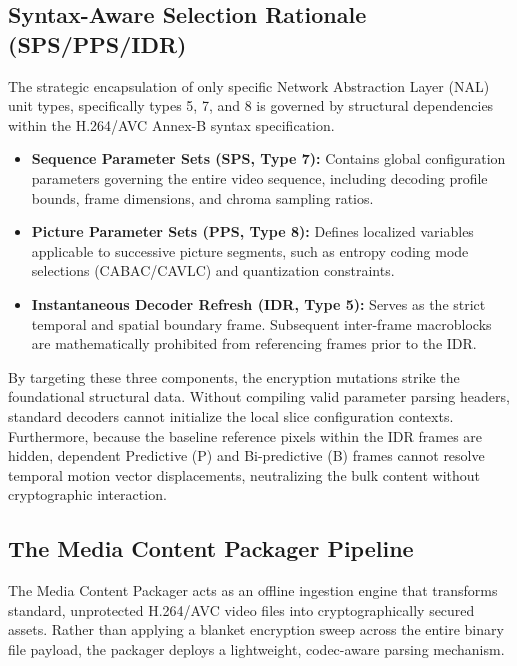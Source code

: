 \subsection{Syntax-Aware Selection Rationale (SPS/PPS/IDR)}
The strategic encapsulation of only specific Network Abstraction Layer (NAL) unit types, specifically types 5, 7, and 8 is governed by structural dependencies within the H.264/AVC Annex-B syntax specification.
\begin{itemize}
    \item \textbf{Sequence Parameter Sets (SPS, Type 7):} Contains global configuration parameters governing the entire video sequence, including decoding profile bounds, frame dimensions, and chroma sampling ratios.
    \item \textbf{Picture Parameter Sets (PPS, Type 8):} Defines localized variables applicable to successive picture segments, such as entropy coding mode selections (CABAC/CAVLC) and quantization constraints.
    \item \textbf{Instantaneous Decoder Refresh (IDR, Type 5):} Serves as the strict temporal and spatial boundary frame. Subsequent inter-frame macroblocks are mathematically prohibited from referencing frames prior to the IDR.
\end{itemize}
By targeting these three components, the encryption mutations strike the foundational structural data. Without compiling valid parameter parsing headers, standard decoders cannot initialize the local slice configuration contexts. Furthermore, because the baseline reference pixels within the IDR frames are hidden, dependent Predictive (P) and Bi-predictive (B) frames cannot resolve temporal motion vector displacements, neutralizing the bulk content without cryptographic interaction.

\subsection{The Media Content Packager Pipeline}
The Media Content Packager acts as an offline ingestion engine that transforms standard, unprotected H.264/AVC video files into cryptographically secured assets. Rather than applying a blanket encryption sweep across the entire binary file payload, the packager deploys a lightweight, codec-aware parsing mechanism.

